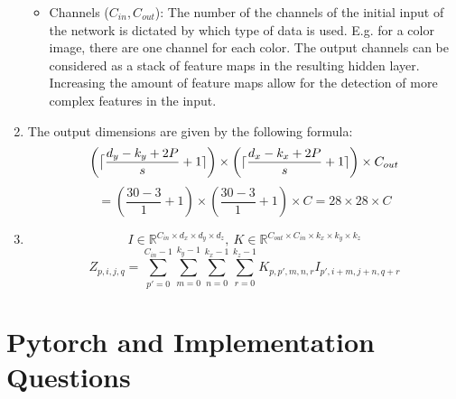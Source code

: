 \documentclass{article}
\begin{document}
\begin{enumerate}[label=(\alph*)]
\begin{itemize}
		\item Channels ($C_{in}, C_{out}$): The number of the channels of the initial input of the network is dictated by which type of data is used. E.g. for a color image, there are one channel for each color. The output channels can be considered as a stack of feature maps in the resulting hidden layer. Increasing the amount of feature maps allow for the detection of more complex features in the input. 
	\end{itemize}
	\item The output dimensions are given by the following formula: $$\left(\big{\lceil} \frac{d_y - k_y + 2P}{s}+1 \rceil\right) \times \left(\lceil \frac{d_x - k_x + 2P}{s}+1 \rceil\right) \times C_{out}$$ $$ = \left(\frac{30 - 3}{1}+1\right) \times \left(\frac{30 - 3}{1}+1\right) \times C = 28 \times 28 \times C$$
	\item $$I \in \mathbb{R}^{C_{in} \times d_x \times d_y \times d_z}, \ K \in \mathbb{R}^{C_{out} \times C_{in} \times k_x \times k_y \times k_z}$$ $$Z_{p, i, j, q} = \sum_{p'=0}^{C_{in}-1}\sum_{m=0}^{k_y-1}\sum_{n=0}^{k_x-1}\sum_{r=0}^{k_z-1}K_{p, p', m,n,r}I_{p', i+m, j+n, q+r}$$
\end{enumerate}

\section{Pytorch and Implementation Questions}
\end{document}
